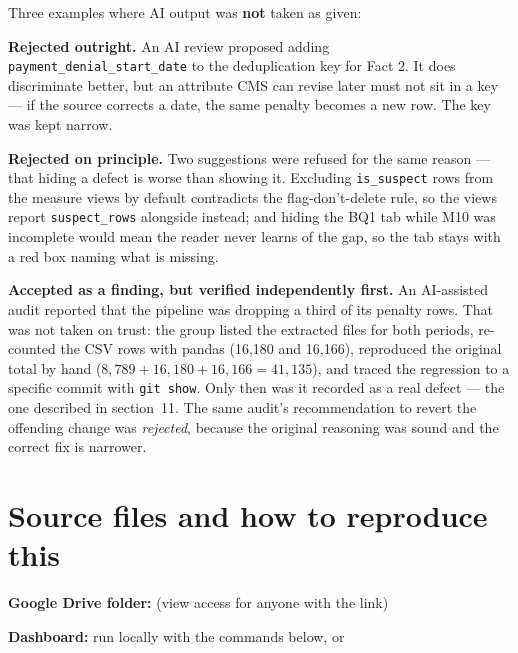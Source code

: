 \documentclass[11pt,a4paper]{article}
\newcommand{\code}[1]{\texttt{#1}}
\begin{document}
Three examples where AI output was \textbf{not} taken as given:

\textbf{Rejected outright.} An AI review proposed adding
\code{payment\_denial\_start\_date} to the deduplication key for Fact 2. It does
discriminate better, but an attribute CMS can revise later must not sit in a key
— if the source corrects a date, the same penalty becomes a new row. The key was
kept narrow.

\textbf{Rejected on principle.} Two suggestions were refused for the same
reason — that hiding a defect is worse than showing it. Excluding
\code{is\_suspect} rows from the measure views by default contradicts the
flag-don't-delete rule, so the views report \code{suspect\_rows} alongside
instead; and hiding the BQ1 tab while M10 was incomplete would mean the reader
never learns of the gap, so the tab stays with a red box naming what is missing.

\textbf{Accepted as a finding, but verified independently first.} An AI-assisted
audit reported that the pipeline was dropping a third of its penalty rows. That
was not taken on trust: the group listed the extracted files for both periods,
re-counted the CSV rows with pandas (16{,}180 and 16{,}166), reproduced the
original total by hand ($8{,}789 + 16{,}180 + 16{,}166 = 41{,}135$), and traced
the regression to a specific commit with \code{git show}. Only then was it
recorded as a real defect — the one described in section~11. The same audit's
recommendation to revert the offending change was \emph{rejected}, because the
original reasoning was sound and the correct fix is narrower.

\section{Source files and how to reproduce this}

\textbf{Google Drive folder:} \underline{\hspace{7cm}} \quad (view access for
anyone with the link)

\textbf{Dashboard:} run locally with the commands below, or
\underline{\hspace{5cm}}
\end{document}
